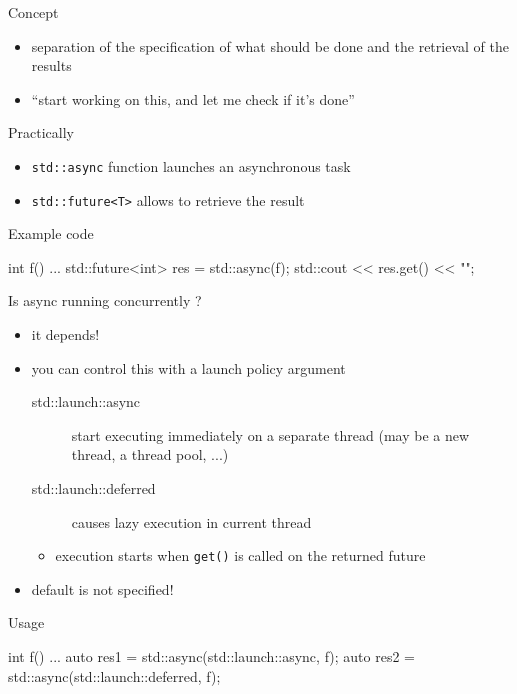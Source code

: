 \begin{frame}[fragile]
  \begin{block}{Concept}
    \begin{itemize}
    \item separation of the specification of what should be done and the retrieval of the results
    \item ``start working on this, and let me check if it's done''
    \end{itemize}
  \end{block}
  \pause
  \begin{block}{Practically}
    \begin{itemize}
    \item \texttt{std::async} function launches an asynchronous task
    \item \texttt{std::future<T>} allows to retrieve the result
    \end{itemize}
  \end{block}
  \pause
  \begin{exampleblock}{Example code}
    \begin{cppcode*}{}
      int f() {...}
      std::future<int> res = std::async(f);
      std::cout << res.get() << "\n";
    \end{cppcode*}
  \end{exampleblock}
\end{frame}

\begin{frame}[fragile]
  \begin{block}{Is async running concurrently ?}
    \begin{itemize}
    \item it depends!
    \item you can control this with a launch policy argument
      \begin{description}
      \item[std::launch::async] start executing immediately on a separate thread (may be a new thread, a thread pool, ...)
      \item[std::launch::deferred] causes lazy execution in current thread
      \end{description}
      \begin{itemize}
      \item execution starts when \texttt{get()} is called on the returned future
      \end{itemize}
    \item default is not specified!
    \end{itemize}
  \end{block}
  \pause
  \begin{exampleblock}{Usage}
    \begin{cppcode*}{}
      int f() {...}
      auto res1 = std::async(std::launch::async, f);
      auto res2 = std::async(std::launch::deferred, f);
    \end{cppcode*}
  \end{exampleblock}
\end{frame}

